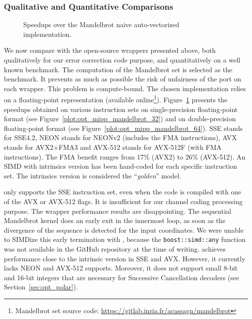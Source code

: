 \subsubsection{Qualitative and Quantitative Comparisons}

\begin{figure}[htp]
  \centering
  \quad
  \caption{Speedups over the Mandelbrot naive auto-vectorized implementation.}
  \label{plot:opt_mipp_mandelbrot}
\end{figure}

We now compare \MIPP with the open-source wrappers presented above, both
qualitatively for our error correction code purpose, and quantitatively on a
well known benchmark. The computation of the Mandelbrot set is selected as the
benchmark. It prevents as much as possible the risk of unfairness of the port on
each wrapper. This problem is compute-bound. The chosen implementation relies on
a floating-point representation (available online\footnote{Mandelbrot set source
code: \url{https://gitlab.inria.fr/acassagn/mandelbrot}}).
Figure~\ref{plot:opt_mipp_mandelbrot} presents the speedups obtained on various
instruction sets on single-precision floating-point format (see
Figure~\ref{plot:opt_mipp_mandelbrot_32}) and on double-precision floating-point
format (see Figure~\ref{plot:opt_mipp_mandelbrot_64}). SSE stands for SSE4.2,
NEON stands for NEONv2 (includes the FMA instructions), AVX stands for AVX2+FMA3
and AVX-512 stands for AVX-512F (with FMA instructions). The FMA benefit ranges
from 17\% (AVX2) to 26\% (AVX-512). An SIMD with intrinsics version has been
hand-coded for each specific instruction set. The intrinsics version is
considered the ``\emph{golden}'' model.

\textbf{\BoostSIMD} only supports the SSE instruction set, even when the code is
compiled with one of the AVX or AVX-512 flags. It is insufficient for our
channel coding processing purpose. The \BoostSIMD wrapper performance results
are disappointing. The sequential Mandelbrot kernel does an early exit in the
innermost loop, as soon as the divergence of the sequence is detected for the
input coordinates. We were unable to SIMDize this early termination with
\BoostSIMD, because the \verb|boost::simd::any| function was not available in
the GitHub repository at the time of writing. \textbf{\xsimd} achieves
performance close to the intrinsic version in SSE and AVX. However, it currently
lacks NEON and AVX-512 supports. Moreover, it does not support small 8-bit and
16-bit integers that are necessary for Successive Cancellation decoders (see
Section~\ref{sec:opt_polar}).

